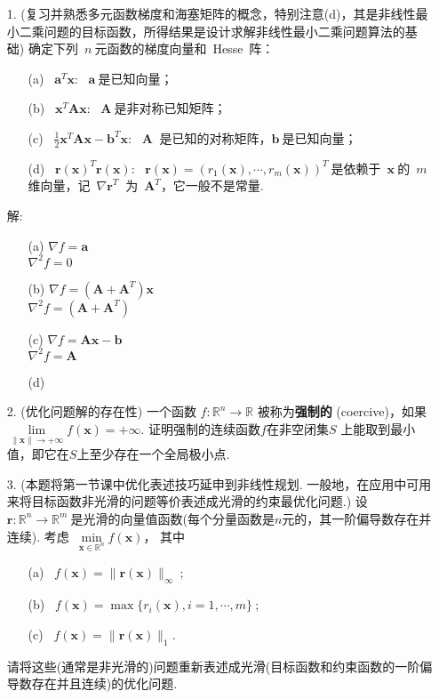 \documentclass[a4paper,12pt]{ctexart}
\newcommand{\tr}{{\scriptscriptstyle T}}  %
\def\R{{\mathbb R}}%
\newcommand\ba{{\bm a}}
\newcommand\bA{{\bm A}}
\newcommand\bx{{\bm x}}
\newcommand\bb{{\bm b}}
\newcommand\br{{\bm r}}
\begin{document}
\begin{enumerate}

\item [1.] (复习并熟悉多元函数梯度和海塞矩阵的概念，特别注意(d)，其是非线性最小二乘问题的目标函数，所得结果是设计求解非线性最小二乘问题算法的基础)
确定下列~$n~$元函数的梯度向量和~Hesse~阵：
    \begin{enumerate}
    \item[(a)] ~$\ba^{\tr}\bx$: ~$\ba~$是已知向量；
    \item[(b)] ~$\bx^{\tr}\bA\bx$: ~$\bA~$是非对称已知矩阵；
    \item[(c)] ~$\tfrac{1}{2}\bx^{\tr}\bA\bx-\bb^{\tr}\bx$: ~$\bA~$ 是已知的对称矩阵，$\bb~$是已知向量；
    \item[(d)] ~$\br(\bx)^{\tr}\br(\bx)$: ~$\br(\bx)=(r_1(\bx), \cdots, r_m(\bx))^{\tr}~$是依赖于~$\bx~$的~$m~$维向量，记~${\nabla \br}^{\tr}~$ 为~$\bA^{\tr}$，它一般不是常量.
    \end{enumerate}

解:
\begin{enumerate}
    \item[(a)]
    $\nabla f = \ba$ \\
    $\nabla^2 f = 0$
    \item[(b)]
    $\nabla f = (\bA+\bA^T)\bx$ \\
    $\nabla^2 f = (\bA+\bA^T)$
    \item[(c)]
    $\nabla f = \bA\bx-\bb$ \\
    $\nabla^2 f = \bA$
    \item[(d)]

\end{enumerate}

\item[2.](优化问题解的存在性) 一个函数 $f : \R^n \to \R$ 被称为{\bf 强制的} (coercive)，如果$\lim\limits_{\|\bx\| \to +\infty} f(\bx) = +\infty$. 证明强制的连续函数$f$在非空闭集$S$ 上能取到最小值，即它在$S$上至少存在一个全局极小点.

\item[3.](本题将第一节课中优化表述技巧延申到非线性规划. 一般地，在应用中可用来将目标函数非光滑的问题等价表述成光滑的约束最优化问题.)
 设~$\br:\R^n\to \R^m~$是光滑的向量值函数(每个分量函数是$n$元的，其一阶偏导数存在并连续). 考虑~$\min\limits_{\bx\in \R^n} f(\bx)$， 其中
    \begin{enumerate}
    \item[(a)] ~$f(\bx)=\|\br(\bx)\|_\infty~$;
    \item[(b)] ~$f(\bx)=\max\{r_i(\bx), i=1,\cdots,m\}~$;
    \item[(c)] ~$f(\bx)=\|\br(\bx)\|_1$.
    \end{enumerate}
    请将这些(通常是非光滑的)问题重新表述成光滑(目标函数和约束函数的一阶偏导数存在并且连续)的优化问题.


\end{enumerate}
\end{document}
